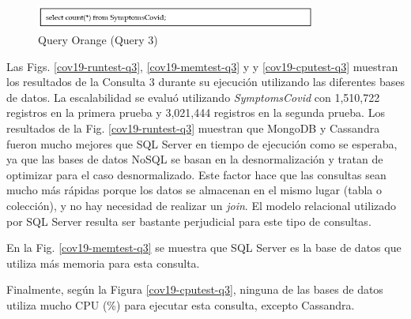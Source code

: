 \documentclass[pdflatex,sn-mathphys-num]{sn-jnl}
\theoremstyle{thmstyleone}%
\theoremstyle{thmstyletwo}%
\theoremstyle{thmstylethree}%
\begin{document}
\vspace{-0.5cm}

\begin{figure}[H]
    \begin{center}
        \includegraphics[width=0.82\textwidth]{figs/cov19-query3.png}
        \caption{Query Orange (Query 3)}
        \label{cov19-q3}
    \end{center}
\end{figure}

\vspace{-0.6cm}

Las Figs. \ref{cov19-runtest-q3}, \ref{cov19-memtest-q3} y y \ref{cov19-cputest-q3} muestran los resultados de la Consulta 3 durante su ejecución utilizando las diferentes bases de datos. La escalabilidad se evaluó utilizando \textit{SymptomsCovid} con 1,510,722 registros en la primera prueba y 3,021,444 registros en la segunda prueba. Los resultados de la Fig. \ref{cov19-runtest-q3} muestran que MongoDB y Cassandra fueron mucho mejores que SQL Server en tiempo de ejecución como se esperaba, ya que las bases de datos NoSQL se basan en la desnormalización y tratan de optimizar para el caso desnormalizado. Este factor hace que las consultas sean mucho más rápidas porque los datos se almacenan en el mismo lugar (tabla o colección), y no hay necesidad de realizar un \textit{join}. El modelo relacional utilizado por SQL Server resulta ser bastante perjudicial para este tipo de consultas.

En la Fig. \ref{cov19-memtest-q3} se muestra que SQL Server es la base de datos que utiliza más memoria para esta consulta. 

Finalmente, según la Figura \ref{cov19-cputest-q3}, ninguna de las bases de datos utiliza mucho CPU (\%) para ejecutar esta consulta, excepto Cassandra.
\end{document}
